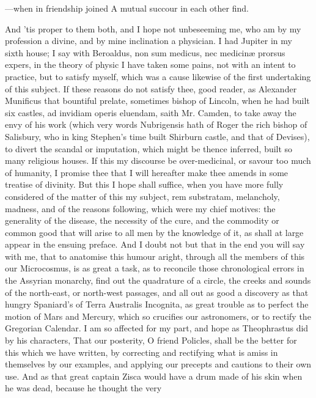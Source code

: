 {---when in friendship joined
A mutual succour in each other find.

And 'tis proper to them both, and I hope not unbeseeming me, who am by
my profession a divine, and by mine inclination a physician. I had
Jupiter in my sixth house; I say with Beroaldus, non sum medicus,
nec medicin\ae{} prorsus expers, in the theory of physic I have taken some
pains, not with an intent to practice, but to satisfy myself, which was
a cause likewise of the first undertaking of this subject.
If these reasons do not satisfy thee, good reader, as Alexander
Munificus that bountiful prelate, sometimes bishop of Lincoln, when he
had built six castles, ad invidiam operis eluendam, saith Mr.
Camden, to take away the envy of his work (which very words Nubrigensis
hath of Roger the rich bishop of Salisbury, who in king Stephen's time
built Shirburn castle, and that of Devises), to divert the scandal or
imputation, which might be thence inferred, built so many religious
houses. If this my discourse be over-medicinal, or savour too much of
humanity, I promise thee that I will hereafter make thee amends in some
treatise of divinity. But this I hope shall suffice, when you have more
fully considered of the matter of this my subject, rem substratam,
melancholy, madness, and of the reasons following, which were my chief
motives: the generality of the disease, the necessity of the cure, and
the commodity or common good that will arise to all men by the
knowledge of it, as shall at large appear in the ensuing preface. And I
doubt not but that in the end you will say with me, that to anatomise
this humour aright, through all the members of this our Microcosmus, is
as great a task, as to reconcile those chronological errors in the
Assyrian monarchy, find out the quadrature of a circle, the creeks and
sounds of the north-east, or north-west passages, and all out as good a
discovery as that hungry Spaniard's of Terra Australis Incognita,
as great trouble as to perfect the motion of Mars and Mercury, which so
crucifies our astronomers, or to rectify the Gregorian Calendar. I am
so affected for my part, and hope as Theophrastus did by his
characters, That our posterity, O friend Policles, shall be the better
for this which we have written, by correcting and rectifying what is
amiss in themselves by our examples, and applying our precepts and
cautions to their own use. And as that great captain Zisca would have a
drum made of his skin when he was dead, because he thought the very
}
